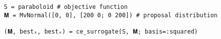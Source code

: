 \begin{lstlisting}[language=JuliaLocal]
S = paraboloid # objective function
𝐌 = MvNormal([0, 0], [200 0; 0 200]) # proposal distribution

(𝐌, bestₓ, bestᵥ) = ce_surrogate(S, 𝐌; basis=:squared)
\end{lstlisting}
